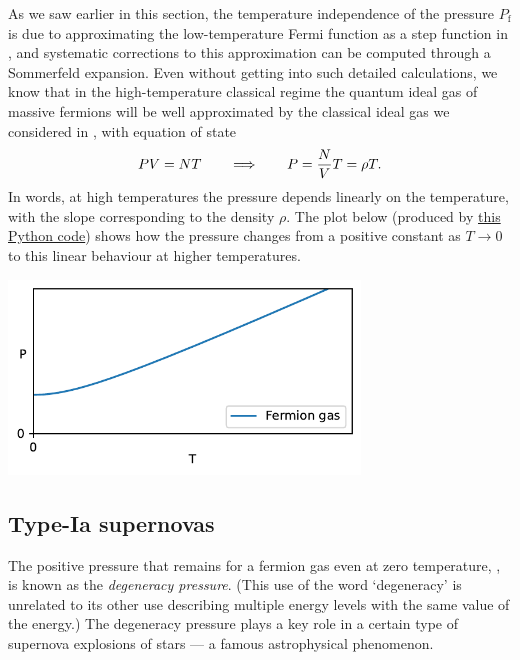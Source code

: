 As we saw earlier in this section, the temperature independence of the pressure $P_{\text{f}}$ is due to approximating the low-temperature Fermi function as a step function in , and systematic corrections to this approximation can be computed through a Sommerfeld expansion.
Even without getting into such detailed calculations, we know that in the high-temperature classical regime the quantum ideal gas of massive fermions will be well approximated by the classical ideal gas we considered in , with equation of state
\begin{equation}
  PV = NT \qquad \Longrightarrow \qquad P = \frac{N}{V} T = \rho T.
\end{equation}
In words, at high temperatures the pressure depends linearly on the temperature, with the slope corresponding to the density $\rho$.
The plot below (produced by \href{https://github.com/daschaich/MATH327_2023/blob/main/lecture_notes/unit08_pressure.py}{this Python code}) shows how the pressure changes from a positive constant as $T \to 0$ to this linear behaviour at higher temperatures. \\[-24 pt]
\begin{center}\includegraphics[width=0.7\textwidth]{figs/unit08_pressure.pdf}\end{center} %



\subsection{Type-{\textrm I}a supernovas}
The positive pressure that remains for a fermion gas even at zero temperature, , is known as the \textit{degeneracy pressure}.
(This use of the word `degeneracy' is unrelated to its other use describing multiple energy levels with the same value of the energy.)
The degeneracy pressure plays a key role in a certain type of supernova explosions of stars --- a famous astrophysical phenomenon.

